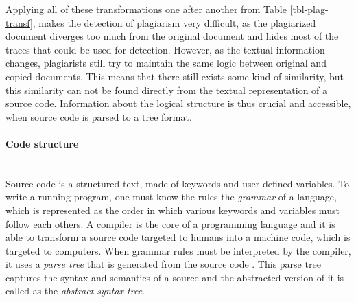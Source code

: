 \begin{table}[ht]
\centering
\caption{Six levels of transformation which can be applied to any source code document.}
\label{tbl-plag-transf}
\end{table}

\noindent
Applying all of these transformations one after another from Table \ref{tbl-plag-transf}, makes the detection of plagiarism very difficult, as the plagiarized document diverges too much from the original document and hides most of the traces that could be used for detection. However, as the textual information changes, plagiarists still try to maintain the same logic between original and copied documents. This means that there still exists some kind of similarity, but this similarity can not be found directly from the textual representation of a source code. Information about the logical structure is thus crucial and accessible, when source code is parsed to a tree format.

\paragraph{Code structure}\mbox{}\\
Source code is a structured text, made of keywords and user-defined variables. To write a running program, one must know the rules \ie the \emph{grammar} of a language, which is represented as the order in which various keywords and variables must follow each others. A compiler is the core of a programming language and it is able to transform a source code targeted to humans into a machine code, which is targeted to computers. When grammar rules must be interpreted by the compiler, it uses a \emph{parse tree} that is generated from the source code \cite{johnson1975yacc}. This parse tree captures the syntax and semantics of a source and the abstracted version of it is called as the \emph{abstract syntax tree}. 

